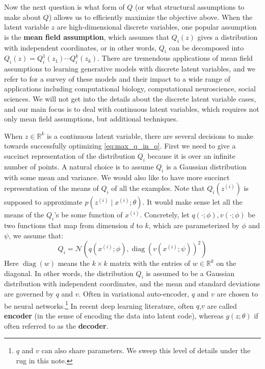 Now the next question is what form of $Q$ (or what structural assumptions
to make about $Q$) allows us to efficiently maximize the objective above. When
the latent variable $z$ are high-dimensional discrete variables, one popular
assumption is the \textbf{mean field assumption}, which assumes that $Q_i (z)$ gives a
distribution with independent coordinates, or in other words, $Q_i$ can be
decomposed into $Q_i(z) = Q^1_i(z_1)\cdots Q^k_i(z_k)$. There are tremendous applications
of mean field assumptions to learning generative models with discrete latent
variables, and we refer to \citeauthor{blei2017variational} for a survey of these models and their impact
to a wide range of applications including computational biology,
computational neuroscience, social sciences. We will not get into the details about
the discrete latent variable cases, and our main focus is to deal with
continuous latent variables, which requires not only mean field assumptions, but
additional techniques.

When $z \in \mathbb R^k$ is a continuous latent variable, there are several decisions to
make towards successfully optimizing \cref{eq:max_q_in_q}. First we need to give a succinct
representation of the distribution $Q_i$ because it is over an infinite number of
points. A natural choice is to assume $Q_i$ is a Gaussian distribution with some
mean and variance. We would also like to have more succinct representation
of the means of $Q_i$ of all the examples. Note that $Q_i(z^{(i)})$ is supposed to
approximate $p(z^{(i)} \mid x^{(i)} ;\theta)$. It would make sense let all the means of the $Q_i$'s
be some function of $x^{(i)}$. Concretely, let $q(\cdot ;\phi),v(\cdot ;\phi)$ be two functions that
map from dimension $d$ to $k$, which are parameterized by $\phi$ and $\psi$, we assume
that:
\begin{equation}
    Q_i = \mathcal N(q(x^{(i)} ;\phi),\operatorname{diag}(v(x^{(i)} ;\psi))^2)\label{eq:q_i_diag}
\end{equation}
Here $\operatorname{diag}(w)$ means the $k \times k$ matrix with the entries of $w \in \mathbb R^k$ on the
diagonal. In other words, the distribution $Q_i$ is assumed to be a Gaussian
distribution with independent coordinates, and the mean and standard
deviations are governed by $q$ and $v$. Often in variational auto-encoder, $q$ and $v$
are chosen to be neural networks.\footnote{
$q$ and $v$ can also share parameters. We sweep this level of details under the rug in this
note.
} In recent deep learning literature, often
$q$,$v$ are called \textbf{encoder} (in the sense of encoding the data into latent code),
whereas $g(z;\theta)$ if often referred to as the \textbf{decoder}.

